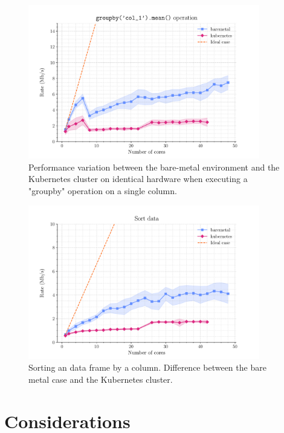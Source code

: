 \begin{figure}
  \centering
  \includegraphics[width=0.9\textwidth]{img/chpt4/df-group-by-operation}
  \caption{Performance variation between the bare-metal environment and the
    Kubernetes cluster on identical hardware when executing a "groupby"
    operation on a single column.}
  \label{fig:dataframe-reduction-std}
\end{figure}

\begin{figure}
  \centering
  \includegraphics[width=0.9\textwidth]{img/chpt4/df-order-data}
  \caption{Sorting an data frame by a column. Difference between the bare metal
    case and the Kubernetes cluster.}
  \label{fig:dataframe-sort}
\end{figure}

\section{Considerations}

